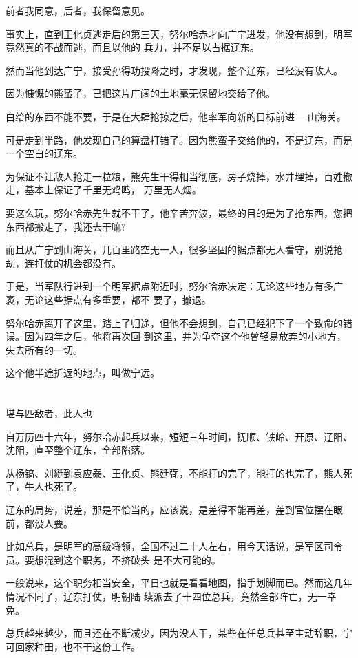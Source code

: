 \documentclass[11pt,a4paper,onecolumn]{article}
\begin{document}
前者我同意，后者，我保留意见。

事实上，直到王化贞逃走后的第三天，努尔哈赤才向广宁进发，他没有想到，明军竟然真的不战而逃，而且以他的
兵力，并不足以占据辽东。

然而当他到达广宁，接受孙得功投降之时，才发现，整个辽东，已经没有敌人。

因为慷慨的熊蛮子，已把这片广阔的土地毫无保留地交给了他。

白给的东西不能不要，于是在大肆抢掠之后，他率军向新的目标前进----山海关。

可是走到半路，他发现自己的算盘打错了。因为熊蛮子交给他的，不是辽东，而是一个空白的辽东。

为保证不让敌人抢走一粒粮，熊先生干得相当彻底，房子烧掉，水井埋掉，百姓撤走，基本上保证了千里无鸡鸣，
万里无人烟。

要这么玩，努尔哈赤先生就不干了，他辛苦奔波，最终的目的是为了抢东西，您把东西都搬走了，我还去干嘛?

而且从广宁到山海关，几百里路空无一人，很多坚固的据点都无人看守，别说抢劫，连打仗的机会都没有。

于是，当军队行进到一个明军据点附近时，努尔哈赤决定：无论这些地方有多广袤，无论这些据点有多重要，都不
要了，撤退。

努尔哈赤离开了这里，踏上了归途，但他不会想到，自己已经犯下了一个致命的错误。因为四年之后，他将再次回
到这里，并为争夺这个他曾轻易放弃的小地方，失去所有的一切。

这个他半途折返的地点，叫做宁远。

\section[\thesection]{}

堪与匹敌者，此人也

自万历四十六年，努尔哈赤起兵以来，短短三年时间，抚顺、铁岭、开原、辽阳、沈阳，直至整个辽东，全部陷落。

从杨镐、刘綎到袁应泰、王化贞、熊廷弼，不能打的完了，能打的也完了，熊人死了，牛人也死了。

辽东的局势，说差，那是不恰当的，应该说，是差得不能再差，差到官位摆在眼前，都没人要。

比如总兵，是明军的高级将领，全国不过二十人左右，用今天话说，是军区司令员。要想混到这个职务，不挤破头
是不大可能的。

一般说来，这个职务相当安全，平日也就是看看地图，指手划脚而已。然而这几年情况不同了，辽东打仗，明朝陆
续派去了十四位总兵，竟然全部阵亡，无一幸免。

总兵越来越少，而且还在不断减少，因为没人干，某些在任总兵甚至主动辞职，宁可回家种田，也不干这份工作。
\end{document}
